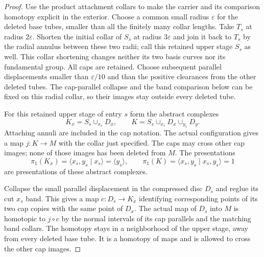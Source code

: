 \begin{proof}
Use the product attachment collars to make the carrier and its
comparison homotopy explicit in the exterior.  Choose a common small
radius $\varepsilon$ for the deleted base tubes, smaller than all the
finitely many collar lengths.  Take $T_s$ at radius $2\varepsilon$.
Shorten the initial collar of $S_s$ at radius $3\varepsilon$ and join
it back to $T_s$ by the radial annulus between these two radii; call
this retained upper stage $S_s$ as well.  This collar shortening
changes neither its two basis curves nor its fundamental group.
All caps are retained.  Choose subsequent parallel displacements
smaller than $\varepsilon/10$ and than the positive clearances from
the other deleted tubes.  The cap-parallel collapse and the band
comparison below can be fixed on this radial collar, so their images
stay outside every deleted tube.

For this retained upper stage of entry $s$ form the abstract complexes
\[
 K_x=S_s\cup_{x_s}D_x,\qquad
 K=S_s\cup_{x_s}D_x\cup_{y_s}D_y.
\]
Attaching annuli are included in the cap notation.  The actual
configuration gives a map $j:K\longrightarrow M$ with the
collar just specified.  The caps may cross other cap images;
none of those images has been deleted from $M$.  The presentations
\begin{equation}\label{geo:carrier-groups}
 \pi_1(K_x)=\langle x_s,y_s\mid x_s\rangle
               =\langle y_s\rangle,
 \qquad
 \pi_1(K)=\langle x_s,y_s\mid x_s,y_s\rangle=1
\end{equation}
are presentations of these abstract complexes.

Collapse the small parallel displacement in the compressed disc
$D_s$ and reglue its cut $x_s$ band.  This gives a map
$c:D_s\longrightarrow K_x$ identifying corresponding points
of its two cap copies with the same point of $D_x$.  The actual
map of $D_s$ into $M$ is homotopic to $j\circ c$ by the normal
intervals of its cap parallels and the matching band collars.
The homotopy stays in a neighborhood of the upper stage, away
from every deleted base tube.  It is a homotopy of maps and is
allowed to cross the other cap images.


\end{proof}
